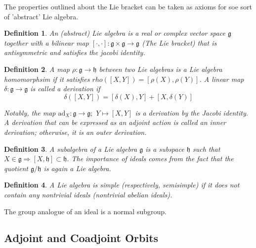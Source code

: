\documentclass{article}
\newtheorem{defn}{Definition}
\begin{document}
\indent The properties outlined about the Lie bracket can be taken as axioms for soe sort of 'abstract' Lie algebra.


\begin{defn}

	An \textit{(abstract) Lie algebra} is a real or complex vector space $\mathfrak{g}$ together with a bilinear map $ [\cdot,\cdot]: \mathfrak{g} \times \mathfrak{g} \to \mathfrak{g}$ (The Lie bracket) that is antisymmetric and satisfies the jacobi identity.

\end{defn}


\begin{defn}

	A map $ \rho: \mathfrak{g} \to \mathfrak{h}$ between two Lie algebras is a Lie algebra homomorphsim if it satisfies $rho([X,Y]) = [\rho (X),\rho (Y)]$. A linear map $ \delta: \mathfrak{g} \to \mathfrak{g}$ is called a derivation if 
	\[ \delta([X,Y]) = [ \delta(X),Y]+[X,\delta(Y)]	\]


Notably, the map $\mathrm{ad}_X: \mathfrak{g} \to \mathfrak{g}; \hspace{4pt} Y \mapsto [X,Y]$ is a derivation by the Jacobi identity. A derivation that can be expressed as an adjoint action is called an \textit{inner derivation}; otherwise, it is an \textit{outer derivation}. 
\end{defn}


\begin{defn}

	A \textit{subalgebra} of a Lie algebra $ \mathfrak{g}$ is a subspace $ \mathfrak{h}$ such that $X \in \mathfrak{g} \Rightarrow [X, \mathfrak{h}] \subset \mathfrak{h}$. The importance of ideals comes from the fact that the quotient $ \mathfrak{g}/ \mathfrak{h}$ is again a Lie algebra.

\end{defn}



\begin{defn}

	A Lie algebra is \textit{simple} (respectively, \textit{semisimple}) if it does not contain any nontrivial ideals (nontrivial abelian ideals).

\end{defn}

\indent The group analogue of an ideal is a normal subgroup.


\subsection{Adjoint and Coadjoint Orbits}
\end{document}
